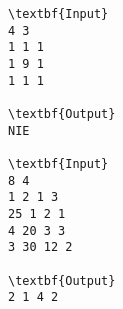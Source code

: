\begin{verbatim}
\textbf{Input}
4 3
1 1 1
1 9 1
1 1 1

\textbf{Output}
NIE

\textbf{Input}
8 4
1 2 1 3
25 1 2 1
4 20 3 3
3 30 12 2

\textbf{Output}
2 1 4 2
\end{verbatim}